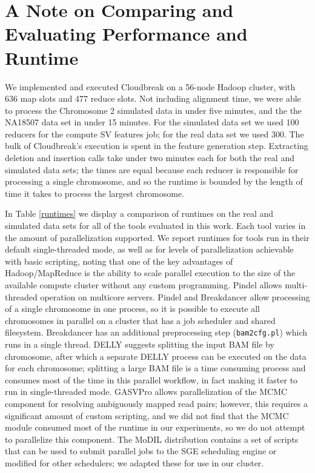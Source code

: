 \section{A Note on Comparing and Evaluating Performance and Runtime}

We implemented and executed Cloudbreak on a 56-node Hadoop cluster, with 636 map slots and 477 reduce slots. Not including alignment time, we were able to process the Chromosome 2 simulated data in under five minutes, and the the NA18507 data set in under 15 minutes. For the simulated data set we used 100 reducers for the compute SV features job; for the real data set we used 300. The bulk of Cloudbreak's execution is spent in the feature generation step. Extracting deletion and insertion calls take under two minutes each for both the real and simulated data sets; the times are equal because each reducer is responsible for processing a single chromosome, and so the runtime is bounded by the length of time it takes to process the largest chromosome. 

In Table \ref{runtimes} we display a comparison of runtimes on the real and simulated data sets for all of the tools evaluated in this work. Each tool varies in the amount of parallelization supported. We report runtimes for tools run in their default single-threaded mode, as well as for levels of parallelization achievable with basic scripting, noting that one of the key advantages of Hadoop/MapReduce is the ability to scale parallel execution to the size of the available compute cluster without any custom programming. Pindel allows multi-threaded operation on multicore servers. Pindel and Breakdancer allow processing of a single chromosome in one process, so it is possible to execute all chromosomes in parallel on a cluster that has a job scheduler and shared filesystem. Breakdancer has an additional preprocessing step (\texttt{bam2cfg.pl}) which runs in a single thread. DELLY suggests splitting the input BAM file by chromosome, after which a separate DELLY process can be executed on the data for each chromosome; splitting a large BAM file is a time consuming process and consumes most of the time in this parallel workflow, in fact making it faster to run in single-threaded mode. GASVPro allows parallelization of the MCMC component for resolving ambiguously mapped read pairs; however, this requires a significant amount of custom scripting, and we did not find that the MCMC module consumed most of the runtime in our experiments, so we do not attempt to parallelize this component. The MoDIL distribution contains a set of scripts that can be used to submit parallel jobs to the SGE scheduling engine or modified for other schedulers; we adapted these for use in our cluster.

